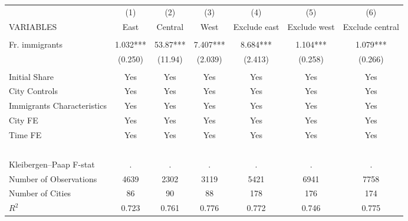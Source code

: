 \begin{tabular}{lcccccc} \hline
 & (1) & (2) & (3) & (4) & (5) & (6) \\
VARIABLES & East & Central & West & Exclude east & Exclude west & Exclude central \\ \hline
 &  &  &  &  &  &  \\
Fr. immigrants & 1.032*** & 53.87*** & 7.407*** & 8.684*** & 1.104*** & 1.079*** \\
 & (0.250) & (11.94) & (2.039) & (2.413) & (0.258) & (0.266) \\
 &  &  &  &  &  &  \\
Initial Share & Yes & Yes & Yes & Yes & Yes & Yes \\
City Controls & Yes & Yes & Yes & Yes & Yes & Yes \\
Immigrants Characteristics & Yes & Yes & Yes & Yes & Yes & Yes \\
City FE & Yes & Yes & Yes & Yes & Yes & Yes \\
Time FE & Yes & Yes & Yes & Yes & Yes & Yes \\
~ & ~ & ~ & ~ & ~ & ~ & ~ \\
Kleibergen–Paap F-stat & . & . & . & . & . & . \\
Number of Observations & 4639 & 2302 & 3119 & 5421 & 6941 & 7758 \\
Number of Cities & 86 & 90 & 88 & 178 & 176 & 174 \\
 $ R^2$ & 0.723 & 0.761 & 0.776 & 0.772 & 0.746 & 0.775 \\ \hline
\end{tabular}
